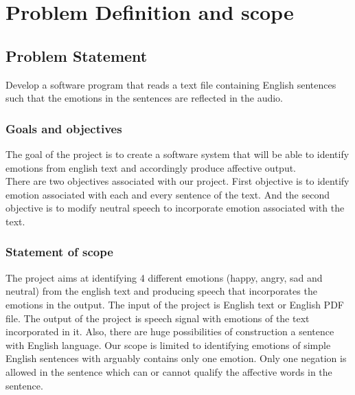 \documentclass[oneside,a4paper,12pt]{book}
\begin{document}
\chapter{Problem Definition and scope}
\section{Problem Statement}
Develop a software program that reads a text file containing English sentences such that the emotions in the sentences are reflected in the audio.


\subsection{Goals and objectives}  
The goal of the project is to create a software system that will be able to identify emotions from english text and accordingly produce affective output.\\
There are two objectives associated with our project. First objective is to identify emotion associated with each and every sentence of the text. And the second objective is to modify neutral speech to incorporate emotion associated with the text.

 \subsection{Statement of scope}
 	The project aims at identifying 4 different emotions (happy, angry, sad and neutral) from the english text and producing speech that incorporates the emotions in the output. The input of the project is English text or English PDF file. The output of the project is speech signal with emotions of the text incorporated in it. Also, there are huge possibilities of construction a sentence with English language. Our scope is limited to identifying emotions of simple English sentences with arguably contains only one emotion. Only one negation is allowed in the sentence which can or cannot qualify the affective words in the sentence.
\end{document}
